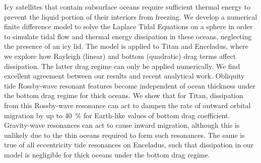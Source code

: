 Icy satellites that contain subsurface oceans require sufficient thermal energy to prevent the liquid portion of their interiors from freezing. We develop a numerical finite difference model to solve the Laplace Tidal Equations on a sphere in order to simulate tidal flow and thermal energy dissipation in these oceans, neglecting the presence of an icy lid. The model is applied to Titan and Enceladus, where we explore how Rayleigh (linear) and bottom (quadratic) drag terms affect dissipation. The latter drag regime can only be applied numerically. We find excellent agreement between our results and recent analytical work. Obliquity tide Rossby-wave resonant features become independent of ocean thickness under the bottom drag regime for thick oceans. We show that for Titan, dissipation from this Rossby-wave resonance can act to dampen the rate of outward orbital migration by up to \SI{40}{\percent} for Earth-like values of bottom drag coefficient. Gravity-wave resonances can act to cause inward migration, although this is unlikely due to the thin oceans required to form such resonances. The same is true of all eccentricity tide resonances on Enceladus, such that dissipation in our model is negligible for thick oceans under the bottom drag regime.  